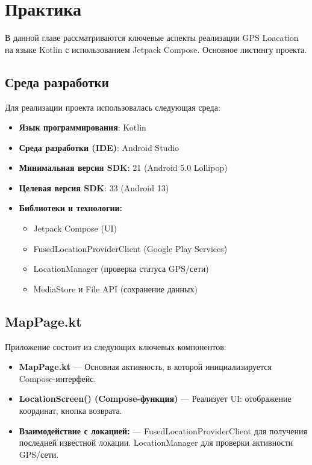 \chapter{Практика}
\label{ch:chap2}

В данной главе рассматриваются ключевые аспекты реализации GPS Loacation на языке Kotlin с использованием Jetpack Compose. 
Основное листингу проекта.

\section{Среда разработки}

Для реализации проекта использовалась следующая среда:

\begin{itemize}
    \item \textbf{Язык программирования}: Kotlin
    \item \textbf{Среда разработки (IDE)}: Android Studio
    \item \textbf{Минимальная версия SDK}: 21 (Android 5.0 Lollipop)
    \item \textbf{Целевая версия SDK}: 33 (Android 13)
    \item \textbf{Библиотеки и технологии:}
    \begin{itemize}
        \item Jetpack Compose (UI)
        \item FusedLocationProviderClient (Google Play Services)
        \item LocationManager (проверка статуса GPS/сети)
        \item MediaStore и File API (сохранение данных)
    \end{itemize}
\end{itemize}

\section{MapPage.kt}

Приложение состоит из следующих ключевых компонентов:

\begin{itemize}
    \item \textbf{MapPage.kt} — Основная активность, в которой инициализируется Compose-интерфейс.
    \item \textbf{LocationScreen() (Compose-функция)} — Реализует UI: отображение координат, кнопка возврата.
    \item \textbf{Взаимодействие с локацией:} — FusedLocationProviderClient для получения последней известной локации. LocationManager для проверки активности GPS/сети.
\end{itemize}


